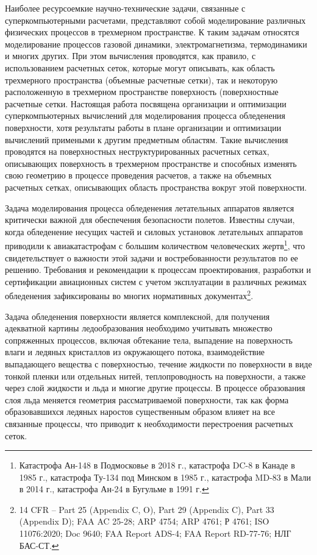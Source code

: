 \documentclass[a4paper,14pt]{extarticle}                     %
\theoremstyle{plain}                                         %
\begin{document}
Наиболее ресурсоемкие научно-технические задачи, связанные с суперкомпьютерными расчетами, представляют собой моделирование различных физических процессов в трехмерном пространстве.
К таким задачам относятся моделирование процессов газовой динамики, электромагнетизма, термодинамики и многих других.
При этом вычисления проводятся, как правило, с использованием расчетных сеток, которые могут описывать, как область трехмерного пространства (объемные расчетные сетки), так и некоторую расположенную в трехмерном пространстве поверхность (поверхностные расчетные сетки.
Настоящая работа посвящена организации и оптимизации суперкомпьютерных вычислений для моделирования процесса обледенения поверхности, хотя результаты работы в плане организации и оптимизации вычислений примеными к другим предметным областям.
Такие вычисления проводятся на поверхностных неструктурированных расчетных сетках, описывающих поверхность в трехмерном пространстве и способных изменять свою геометрию в процессе проведения расчетов, а также на объемных расчетных сетках, описывающих область пространства вокруг этой поверхности.

Задача моделирования процесса обледенения летательных аппаратов является критически важной для обеспечения безопасности полетов.
Известны случаи, когда обледенение несущих частей и силовых установок летательных аппаратов приводили к авиакатастрофам с большим количеством человеческих жертв\footnote[1]{Катастрофа Ан-148 в Подмосковье в 2018 г., катастрофа DC-8 в Канаде в 1985 г., катастрофа Ту-134 под Минском в 1985 г., катастрофа MD-83 в Мали в 2014 г., катастрофа Ан-24 в Бугульме в 1991 г.}, что свидетельствует о важности этой задачи и востребованности результатов по ее решению.
Требования и рекомендации к процессам проектирования, разработки и сертификации авиационных систем с учетом эксплуатации в различных режимах обледенения зафиксированы во многих нормативных документах\footnote[2]{14 CFR -- Part 25 (Appendix C, O), Part 29 (Appendix C), Part 33 (Appendix D); FAA AC 25-28; ARP 4754; ARP 4761; Р 4761; ISO 11076:2020; Doc 9640; FAA Report ADS-4; FAA Report RD-77-76; НЛГ БАС-СТ.}.

Задача обледенения поверхности является комплексной, для получения адекватной картины ледообразования необходимо учитывать множество сопряженных процессов, включая обтекание тела, выпадение на поверхность влаги и ледяных кристаллов из окружающего потока, взаимодействие выпадающего вещества с поверхностью, течение жидкости по поверхности в виде тонкой пленки или отдельных нитей, теплопроводность на поверхности, а также через слой жидкости и льда и многие другие процессы.
В процессе образования слоя льда меняется геометрия рассматриваемой поверхности, так как форма образовавшихся ледяных наростов существенным образом влияет на все связанные процессы, что приводит к необходимости перестроения расчетных сеток.
\end{document}
